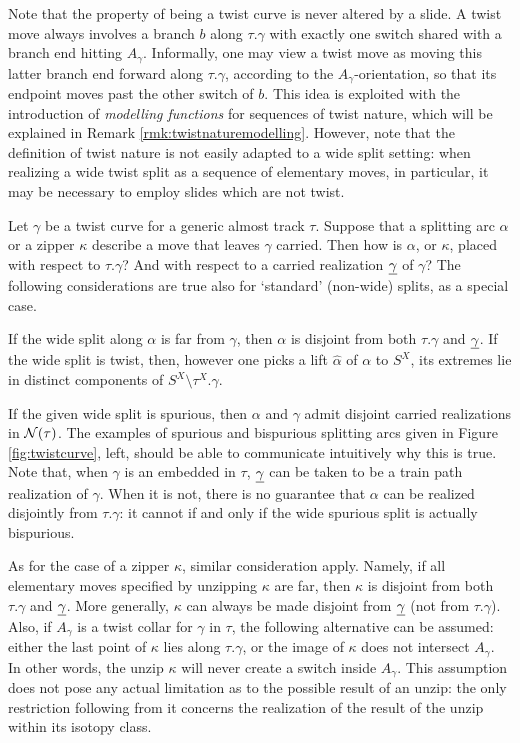 Note that the property of being a twist curve is never altered by a slide. A twist move always involves a branch $b$ along $\tau.\gamma$ with exactly one switch shared with a branch end hitting $A_\gamma$. Informally, one may view a twist move as moving this latter branch end forward along $\tau.\gamma$, according to the $A_\gamma$-orientation, so that its endpoint moves past the other switch of $b$. This idea is exploited with the introduction of \emph{modelling functions} for sequences of twist nature, which will be explained in Remark \ref{rmk:twistnaturemodelling}. However, note that the definition of twist nature is not easily adapted to a wide split setting: when realizing a wide twist split as a sequence of elementary moves, in particular, it may be necessary to employ slides which are not twist.

\begin{rmk}\label{rmk:spurious}
Let $\gamma$ be a twist curve for a generic almost track $\tau$. Suppose that a splitting arc $\alpha$ or a zipper $\kappa$ describe a move that leaves $\gamma$ carried. Then how is $\alpha$, or $\kappa$, placed with respect to $\tau.\gamma$? And with respect to a carried realization $\underline{\gamma}$ of $\gamma$? The following considerations are true also for `standard' (non-wide) splits, as a special case.

If the wide split along $\alpha$ is far from $\gamma$, then $\alpha$ is disjoint from both $\tau.\gamma$ and $\underline{\gamma}$. If the wide split is twist, then, however one picks a lift $\hat\alpha$ of $\alpha$ to $S^X$, its extremes lie in distinct components of $S^X\setminus\tau^X.\gamma$.

If the given wide split is spurious, then $\alpha$ and $\gamma$ admit disjoint carried realizations in ${\mathcal N}(\tau)$. The examples of spurious and bispurious splitting arcs given in Figure \ref{fig:twistcurve}, left, should be able to communicate intuitively why this is true. Note that, when $\gamma$ is an embedded in $\tau$, $\underline{\gamma}$ can be taken to be a train path realization of $\gamma$. When it is not, there is no guarantee that $\alpha$ can be realized disjointly from $\tau.\gamma$: it cannot if and only if the wide spurious split is actually bispurious.

As for the case of a zipper $\kappa$, similar consideration apply. Namely, if all elementary moves specified by unzipping $\kappa$ are far, then $\kappa$ is disjoint from both $\tau.\gamma$ and $\underline{\gamma}$. More generally, $\kappa$ can always be made disjoint from $\underline{\gamma}$ (not from $\tau.\gamma$). Also, if $A_\gamma$ is a twist collar for $\gamma$ in $\tau$, the following alternative can be assumed: either the last point of $\kappa$ lies along $\tau.\gamma$, or the image of $\kappa$ does not intersect $A_\gamma$. In other words, the unzip $\kappa$ will never create a switch inside $A_\gamma$. This assumption does not pose any actual limitation as to the possible result of an unzip: the only restriction following from it concerns the realization of the result of the unzip within its isotopy class.


\end{rmk}
